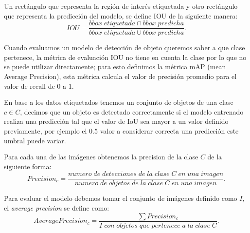 Un rectángulo que representa la región de interés etiquetada y otro rectángulo que representa la predicción del modelo, se define IOU de la siguiente manera:
\begin{equation}
IOU = \frac{bbox\;etiquetada \cap bbox\;predicha}{bbox\;etiquetada \cup bbox\;predicha}.
\end{equation}

Cuando evaluamos un modelo de detección de objeto queremos saber a que clase pertenece, la métrica de evaluación IOU no tiene en cuenta la clase por lo que no se puede utilizar directamente; para esto definimos la métrica mAP (mean Average Precision), esta métrica calcula el valor de precisión promedio para el valor de recall de 0 a 1.

En base a los datos etiquetados tenemos un conjunto de objetos de una clase $c \in C$, decimos que un objeto es detectado correctamente si el modelo entrenado realiza una predicción tal que el valor de IoU sea mayor a un valor definido previamente, por ejemplo el $0.5$ valor a considerar correcta una predicción este umbral puede variar.


Para cada una de las imágenes obtenemos la precision de la clase $C$ de la siguiente forma:
\begin{equation}
Precision_c = \frac{numero\;de\;detecciones\;de\;la\;clase\;C\;en\;una\;imagen}{numero\;de\;objetos\;de\;la\;clase\;C\;en\;una\;imagen}.
\end{equation}

Para evaluar el modelo debemos tomar el conjunto de imágenes definido como $I$, el \textit{average precision} se define como:
\begin{equation}
Average Precision_c = \frac{\sum Precision_c}{I\;con\;objetos\;que\;pertenece\;a\;la\;clase\;C}.
\end{equation}

